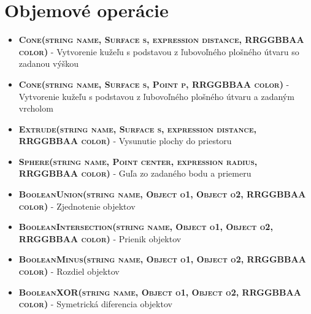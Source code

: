 \section*{Objemové operácie}

\begin{itemize}
\item \textsc{\textbf{Cone(string name, Surface s, expression distance, RRGGBBAA color)}} - Vytvorenie kužeľu s podstavou z ľubovoľného plošného útvaru so zadanou výškou%

\item \textsc{\textbf{Cone(string name, Surface s, Point p, RRGGBBAA color)}} - Vytvorenie kužeľu s podstavou z ľubovoľného plošného útvaru a zadaným vrcholom%

\item \textsc{\textbf{Extrude(string name, Surface s, expression distance, RRGGBBAA color)}}  - Vysunutie plochy do priestoru%


\item \textsc{\textbf{Sphere(string name, Point center, expression radius, RRGGBBAA color)}} - Guľa zo zadaného bodu a priemeru

\item \textsc{\textbf{BooleanUnion(string name, Object o1, Object o2, RRGGBBAA color)}} - Zjednotenie objektov
\item \textsc{\textbf{BooleanIntersection(string name, Object o1, Object o2, RRGGBBAA color)}} - Prienik objektov%
\item \textsc{\textbf{BooleanMinus(string name, Object o1, Object o2, RRGGBBAA color)}} - Rozdiel objektov%
\item \textsc{\textbf{BooleanXOR(string name, Object o1, Object o2, RRGGBBAA color)}} - Symetrická diferencia objektov%
\end{itemize}